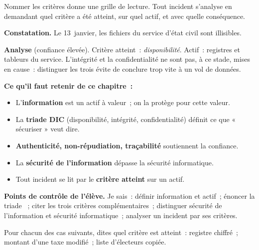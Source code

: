 Nommer les critères donne une grille de lecture. Tout incident s'analyse en
demandant quel critère a été atteint, sur quel actif, et avec quelle
conséquence.

\begin{boxprocedure}
\textbf{Constatation.} Le 13~janvier, les fichiers du service d'état civil
sont illisibles.

\medskip
\textbf{Analyse} (confiance élevée). Critère atteint~: \emph{disponibilité}.
Actif~: registres et tableurs du service. L'intégrité et la confidentialité
ne sont pas, à ce stade, mises en cause~: distinguer les trois évite de
conclure trop vite à un vol de données.
\end{boxprocedure}

\separateur

\begin{boxresume}
\textbf{Ce qu'il faut retenir de ce chapitre~:}
\begin{itemize}
    \item L'\textbf{information} est un actif à valeur~; on la protège pour
          cette valeur.
    \item La \textbf{triade DIC} (disponibilité, intégrité, confidentialité)
          définit ce que « sécuriser » veut dire.
    \item \textbf{Authenticité, non-répudiation, traçabilité} soutiennent la
          confiance.
    \item La \textbf{sécurité de l'information} dépasse la sécurité
          informatique.
    \item Tout incident se lit par le \textbf{critère atteint} sur un actif.
\end{itemize}
\end{boxresume}

\begin{boxinfo}
\textbf{Points de contrôle de l'élève.} Je sais~: définir information et
actif~; énoncer la triade ~; citer les trois critères
complémentaires~; distinguer sécurité de l'information et sécurité
informatique~; analyser un incident par ses critères.
\end{boxinfo}

\bigskip

\begin{boxexo}[title={\ding{45}\quad Exercice~1.1. Trois critères \niveaubase}]
Pour chacun des cas suivants, dites quel critère  est atteint~:
registre chiffré~; montant d'une taxe modifié~; liste d'électeurs copiée.
\end{boxexo}

